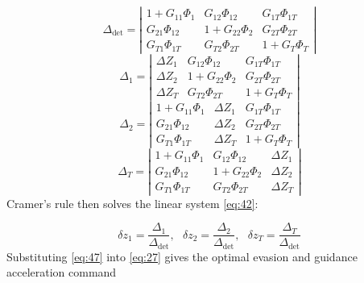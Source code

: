 \begin{equation}
\label{eq:43}
{\Delta _{\text{det}}} = \left| {\begin{array}{*{20}{c}}
  {1 + {G_{11}}{\Phi _1}}&{{G_{12}}{\Phi _{12}}}&{{G_{1T}}{\Phi _{1T}}} \\ 
  {{G_{21}}{\Phi _{12}}}&{1 + {G_{22}}{\Phi _2}}&{{G_{2T}}{\Phi _{2T}}} \\ 
  {{G_{T1}}{\Phi _{1T}}}&{{G_{T2}}{\Phi _{2T}}}&{1 + {G_T}{\Phi _T}} 
\end{array}} \right|
\end{equation}
\begin{equation}
\label{eq:44}
{\Delta _1} = \left| {\begin{array}{*{20}{c}}
  {\Delta {Z_1}}&{{G_{12}}{\Phi _{12}}}&{{G_{1T}}{\Phi _{1T}}} \\ 
  {\Delta {Z_2}}&{1 + {G_{22}}{\Phi _2}}&{{G_{2T}}{\Phi _{2T}}} \\ 
  {\Delta {Z_T}}&{{G_{T2}}{\Phi _{2T}}}&{1 + {G_T}{\Phi _T}} 
\end{array}} \right|
\end{equation}
\begin{equation}
\label{eq:45}
{\Delta _2} = \left| {\begin{array}{*{20}{c}}
  {1 + {G_{11}}{\Phi _1}}&{\Delta {Z_1}}&{{G_{1T}}{\Phi _{1T}}} \\ 
  {{G_{21}}{\Phi _{12}}}&{\Delta {Z_2}}&{{G_{2T}}{\Phi _{2T}}} \\ 
  {{G_{T1}}{\Phi _{1T}}}&{\Delta {Z_T}}&{1 + {G_T}{\Phi _T}} 
\end{array}} \right|
\end{equation}
\begin{equation}
\label{eq:46}
{\Delta _T} = \left| {\begin{array}{*{20}{c}}
  {1 + {G_{11}}{\Phi _1}}&{{G_{12}}{\Phi _{12}}}&{\Delta {Z_1}} \\ 
  {{G_{21}}{\Phi _{12}}}&{1 + {G_{22}}{\Phi _2}}&{\Delta {Z_2}} \\ 
  {{G_{T1}}{\Phi _{1T}}}&{{G_{T2}}{\Phi _{2T}}}&{\Delta {Z_T}} 
\end{array}} \right|
\end{equation}
Cramer's rule then solves the linear system \eqref{eq:42}:

\begin{equation}
\label{eq:47}
{\delta z_1} = \frac{{{\Delta _1}}}{{{\Delta _{\text{det}}}}},{\text{ }}{\delta z_2} = \frac{{{\Delta _2}}}{{{\Delta _{\text{det}}}}},{\text{ }}{\delta z_T} = \frac{{{\Delta _T}}}{{{\Delta _{\text{det}}}}}
\end{equation}
Substituting \eqref{eq:47} into \eqref{eq:27} gives the optimal evasion and guidance acceleration command

